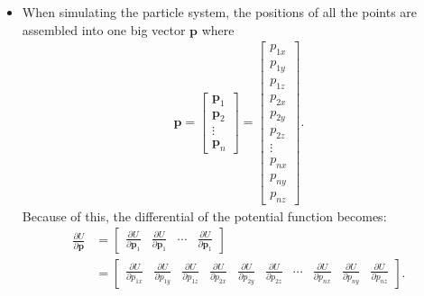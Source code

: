 \documentclass[10pt]{article}
\newcommand{\ve}[1]{\mathbf{#1}}
\begin{document}
\begin{itemize}
    \item When simulating the particle system, the positions of all the points are assembled into one big vector $\ve{p}$ where
    \begin{align*}
      \ve{p}
      = \begin{bmatrix}
        \ve{p}_1 \\
        \ve{p}_2 \\
        \vdots \\
        \ve{p}_n
      \end{bmatrix}
      = \begin{bmatrix}
        p_{1x} \\
        p_{1y} \\
        p_{1z} \\
        p_{2x} \\
        p_{2y} \\
        p_{2z} \\
        \vdots \\
        p_{nx} \\
        p_{ny} \\
        p_{nz}
      \end{bmatrix}.
    \end{align*}
    Because of this, the differential of the potential function becomes:
    \begin{align*}    
      \frac{\partial U}{\partial \ve{p}}
      &= \begin{bmatrix}
        \frac{\partial U}{\partial \ve{p}_1} &
        \frac{\partial U}{\partial \ve{p}_1} &
        \cdots &
        \frac{\partial U}{\partial \ve{p}_1}
      \end{bmatrix}\\
      &= \begin{bmatrix}
        \frac{\partial U}{\partial p_{1x}} &
        \frac{\partial U}{\partial p_{1y}} &
        \frac{\partial U}{\partial p_{1z}} &
        \frac{\partial U}{\partial p_{2x}} &
        \frac{\partial U}{\partial p_{2y}} &
        \frac{\partial U}{\partial p_{2z}} &
        \dotsb &
        \frac{\partial U}{\partial p_{nx}} &
        \frac{\partial U}{\partial p_{ny}} &
        \frac{\partial U}{\partial p_{nz}}
      \end{bmatrix}.
    \end{align*}
  \end{itemize}
\end{document}
